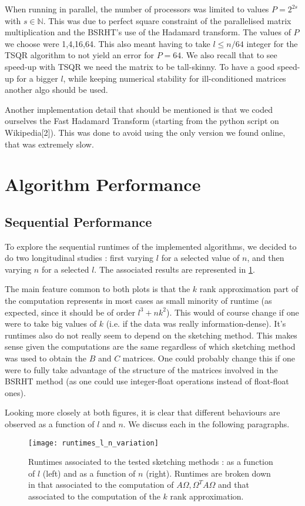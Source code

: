 \documentclass[a4paper, 12pt,oneside]{article}
\begin{document}
		When running in parallel, the number of processors was limited to values $P=2^{2s}$ with $s\in\mathbb{N}$. This was due to perfect square constraint of the parallelised matrix multiplication and the BSRHT's use of the Hadamard transform. The values of $P$ we choose were 1,4,16,64. 		
		This also meant having to take $l\le n/64$ integer for the TSQR algorithm to not yield an error for $P=64$. We also recall that to see speed-up with TSQR we need the matrix to be tall-skinny. To have a good speed-up for a bigger $l$, while keeping numerical stability for ill-conditioned matrices another algo should be used.	

		Another implementation detail that should be mentioned is that we coded ourselves the Fast Hadamard Transform (starting from the python script on Wikipedia[2]). This was done to avoid using the only version we found online, that was extremely slow.
		\section{Algorithm Performance}
        \subsection{Sequential Performance}
		To explore the sequential runtimes of the implemented algorithms, we decided to do two longitudinal studies : first varying $l$ for a selected value of $n$, and then varying $n$ for a selected $l$. The associated results are represented in \ref{fig:runtimes-l-n-variation}. 

		The main feature common to both plots is that the $k$ rank approximation part of the computation represents in most cases as small minority of runtime (as expected, since it should be of order $l^3 +nk^2$). This would of course change if one were to take big values of $k$ (i.e. if the data was really information-dense).  	
		It's runtimes also do not really seem to depend on the sketching method. This makes sense given the computations are the same regardless of which sketching method was used to obtain the $B$ and $C$ matrices. One could probably change this if one were to fully take advantage of the structure of the matrices involved in the BSRHT method (as one could use integer-float operations instead of float-float ones). 

		Looking more closely at both figures, it is clear that different behaviours are observed as a function of $l$ and $n$. We discuss each in the following paragraphs.
		\begin{figure}[htb]       
			\centering             
				\vspace{0em}
				\texttt{[image: runtimes\_l\_n\_variation]}
				\caption{Runtimes associated to the tested sketching methods : as a function of $l$ (left) and as a function of $n$ (right). Runtimes are broken down in that associated to the computation of $A\Omega,\Omega^T A\Omega$ and that associated to the computation of the $k$ rank approximation.}
				\label{fig:runtimes-l-n-variation}
		\end{figure}
\end{document}
